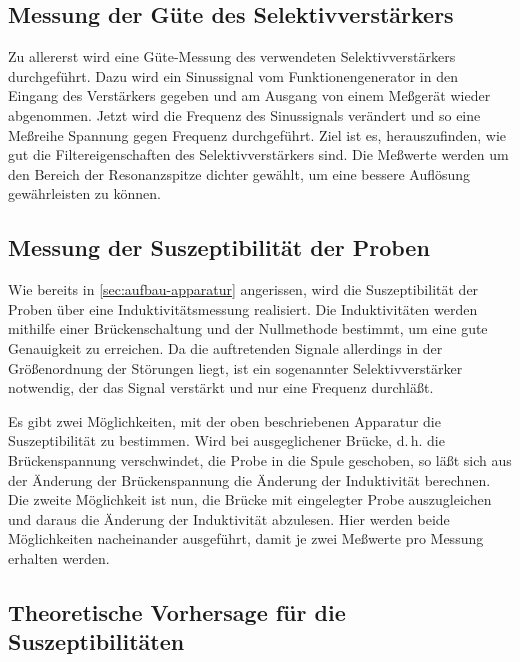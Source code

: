 \subsection{Messung der Güte des Selektivverstärkers}

Zu allererst wird eine Güte-Messung des verwendeten Selektivverstärkers
durchgeführt.  Dazu wird ein Sinussignal vom Funktionengenerator in den
Eingang des Verstärkers gegeben und am Ausgang von einem Meßgerät wieder
abgenommen.  Jetzt wird die Frequenz des Sinussignals verändert und so
eine Meßreihe Spannung gegen Frequenz durchgeführt.  Ziel ist es,
herauszufinden, wie gut die Filtereigenschaften des Selektivverstärkers
sind.  Die Meßwerte werden um den Bereich der Resonanzspitze dichter
gewählt, um eine bessere Auflösung gewährleisten zu können.

\subsection{Messung der Suszeptibilität der Proben}

Wie bereits in \cref{sec:aufbau-apparatur} angerissen, wird die
Suszeptibilität der Proben über eine Induktivitätsmessung realisiert.
Die Induktivitäten werden mithilfe einer Brückenschaltung und der
Nullmethode bestimmt, um eine gute Genauigkeit zu erreichen.  Da die
auftretenden Signale allerdings in der Größenordnung der Störungen
liegt, ist ein sogenannter Selektivverstärker notwendig, der das Signal
verstärkt und nur eine Frequenz durchläßt.

Es gibt zwei Möglichkeiten, mit der oben beschriebenen Apparatur die
Suszeptibilität zu bestimmen.  Wird bei ausgeglichener Brücke,
d.\,h. die Brückenspannung verschwindet, die Probe in die Spule
geschoben, so läßt sich aus der Änderung der Brückenspannung die
Änderung der Induktivität berechnen.  Die zweite Möglichkeit ist nun,
die Brücke mit eingelegter Probe auszugleichen und daraus die Änderung
der Induktivität abzulesen.  Hier werden beide Möglichkeiten
nacheinander ausgeführt, damit je zwei Meßwerte pro Messung erhalten
werden.

\subsection{Theoretische Vorhersage für die Suszeptibilitäten}

